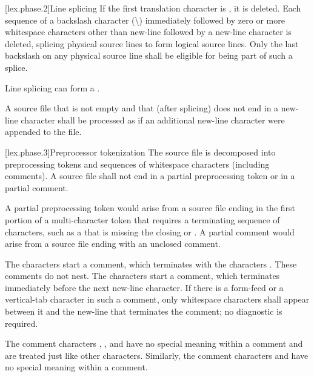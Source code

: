[lex.phase.2]{Line splicing}%
\pnum
{}%
If the first translation character is ,
it is deleted.
Each sequence of a backslash character (\textbackslash)
immediately followed by
zero or more whitespace characters other than new-line followed by
a new-line character is deleted, splicing
physical source lines to form logical source lines. Only the last
backslash on any physical source line shall be eligible for being part
of such a splice.

\pnum
\begin{note}
Line splicing can form
a .
\end{note}

\pnum
A source file that is not empty and that (after splicing)
does not end in a new-line character
shall be processed as if an additional new-line character were appended
to the file.

[lex.phase.3]{Preprocessor tokenization}%
\pnum
The source file is decomposed into preprocessing
tokens and sequences of whitespace characters
(including comments). A source file shall not end in a partial
preprocessing token or in a partial comment.
\begin{footnote}
A partial preprocessing
token would arise from a source file
ending in the first portion of a multi-character token that requires a
terminating sequence of characters, such as a 
that is missing the closing 
or \tcode{>}. A partial comment
would arise from a source file ending with an unclosed \tcode{/*}
comment.
\end{footnote}

\pnum
{}%
%
%
The characters \tcode{/*} start a comment, which terminates with the
characters \tcode{*/}. These comments do not nest.
%
The characters \tcode{//} start a comment, which terminates immediately before the
next new-line character. If there is a form-feed or a vertical-tab
character in such a comment, only whitespace characters shall appear
between it and the new-line that terminates the comment; no diagnostic
is required.

\pnum
\begin{note}
The comment characters \tcode{//}, \tcode{/*},
and \tcode{*/} have no special meaning within a \tcode{//} comment and
are treated just like other characters. Similarly, the comment
characters \tcode{//} and \tcode{/*} have no special meaning within a
\tcode{/*} comment.
\end{note}

